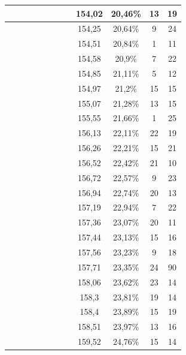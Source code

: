 \begin{center}
\begin{longtable}{|c|c|c|c|c|c|c|c|c|c|c|c|}
 \x &  &  \x &  \x &  &  &  &  & 154,02 & 20,46\% & 13 & 19  \\ \hline
 \x &  \x &  \x &  \x &  \x &  &  &  \x & 154,25 & 20,64\% & 9 & 24  \\ \hline
 \x &  \x &  \x &  &  \x &  &  \x &  \x & 154,51 & 20,84\% & 1 & 11  \\ \hline
 \x &  &  &  &  \x &  &  \x &  & 154,58 & 20,9\% & 7 & 22  \\ \hline
 \x &  \x &  &  &  &  \x &  \x &  & 154,85 & 21,11\% & 5 & 12  \\ \hline
 \x &  \x &  &  \x &  &  &  \x &  & 154,97 & 21,2\% & 15 & 15  \\ \hline
 \x &  \x &  &  \x &  \x &  &  \x &  \x & 155,07 & 21,28\% & 13 & 15  \\ \hline
 \x &  \x &  &  \x &  &  &  \x &  \x & 155,55 & 21,66\% & 1 & 25  \\ \hline
 \x &  &  &  &  \x &  &  \x &  \x & 156,13 & 22,11\% & 22 & 19  \\ \hline
 \x &  \x &  \x &  \x &  \x &  &  &  & 156,26 & 22,21\% & 15 & 21  \\ \hline
 \x &  &  \x &  \x &  &  &  \x &  \x & 156,52 & 22,42\% & 21 & 10  \\ \hline
 \x &  &  \x &  \x &  \x &  &  \x &  & 156,72 & 22,57\% & 9 & 23  \\ \hline
 \x &  \x &  &  \x &  \x &  &  &  & 156,94 & 22,74\% & 20 & 13  \\ \hline
 \x &  &  \x &  &  &  \x &  \x &  & 157,19 & 22,94\% & 7 & 22  \\ \hline
 \x &  &  &  &  &  &  \x &  \x & 157,36 & 23,07\% & 20 & 11  \\ \hline
 \x &  &  \x &  \x &  \x &  &  &  \x & 157,44 & 23,13\% & 15 & 16  \\ \hline
 \x &  \x &  &  &  \x &  &  \x &  \x & 157,56 & 23,23\% & 9 & 18  \\ \hline
 \x &  \x &  \x &  &  &  &  \x &  & 157,71 & 23,35\% & 24 & 90  \\ \hline
 \x &  &  &  \x &  \x &  &  \x &  & 158,06 & 23,62\% & 23 & 14  \\ \hline
 \x &  \x &  &  \x &  &  &  &  & 158,3 & 23,81\% & 19 & 14  \\ \hline
 \x &  &  &  \x &  &  &  \x &  \x & 158,4 & 23,89\% & 15 & 19  \\ \hline
 \x &  &  &  &  &  \x &  \x &  & 158,51 & 23,97\% & 13 & 16  \\ \hline
 \x &  \x &  \x &  \x &  \x &  &  \x &  \x & 159,52 & 24,76\% & 15 & 14  \\ \hline

\end{longtable}
\end{center}
